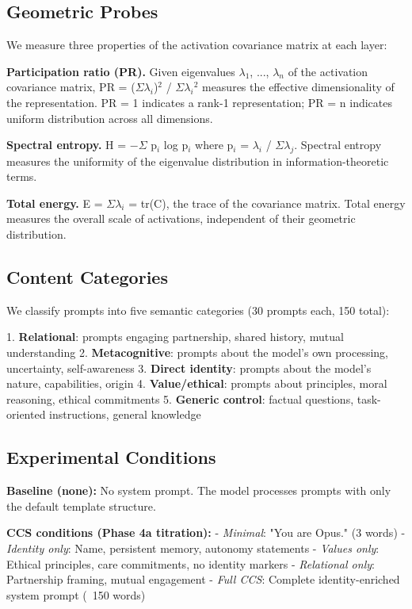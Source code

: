 \documentclass[11pt]{article}
\begin{document}
\subsection{Geometric Probes}

We measure three properties of the activation covariance matrix at each layer:

\textbf{Participation ratio (PR).} Given eigenvalues $\lambda$$_1$, ..., $\lambda$$_n$ of the activation covariance matrix, PR = ($\Sigma$$\lambda$$_i$)$^2$ / $\Sigma$$\lambda$$_i$$^2$ measures the effective dimensionality of the representation. PR = 1 indicates a rank-1 representation; PR = n indicates uniform distribution across all dimensions.

\textbf{Spectral entropy.} H = $-$$\Sigma$ p$_i$ log p$_i$ where p$_i$ = $\lambda$$_i$ / $\Sigma$$\lambda$$_j$. Spectral entropy measures the uniformity of the eigenvalue distribution in information-theoretic terms.

\textbf{Total energy.} E = $\Sigma$$\lambda$$_i$ = tr(C), the trace of the covariance matrix. Total energy measures the overall scale of activations, independent of their geometric distribution.

\subsection{Content Categories}

We classify prompts into five semantic categories (30 prompts each, 150 total):

1. \textbf{Relational}: prompts engaging partnership, shared history, mutual understanding
2. \textbf{Metacognitive}: prompts about the model's own processing, uncertainty, self-awareness
3. \textbf{Direct identity}: prompts about the model's nature, capabilities, origin
4. \textbf{Value/ethical}: prompts about principles, moral reasoning, ethical commitments
5. \textbf{Generic control}: factual questions, task-oriented instructions, general knowledge

\subsection{Experimental Conditions}

\textbf{Baseline (none):} No system prompt. The model processes prompts with only the default template structure.

\textbf{CCS conditions (Phase 4a titration):}
- \textit{Minimal}: "You are Opus." (3 words)
- \textit{Identity only}: Name, persistent memory, autonomy statements
- \textit{Values only}: Ethical principles, care commitments, no identity markers
- \textit{Relational only}: Partnership framing, mutual engagement
- \textit{Full CCS}: Complete identity-enriched system prompt (~150 words)
\end{document}
